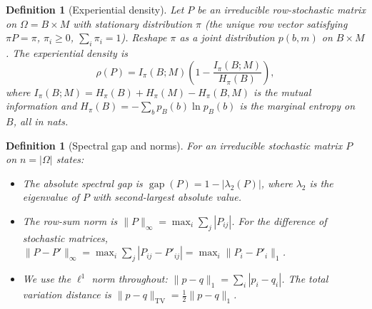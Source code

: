 \documentclass[11pt,a4paper]{article}
\newtheorem{definition}[theorem]{Definition}
\DeclareMathOperator{\gap}{gap}
\begin{document}
\begin{definition}[Experiential density]\label{def:rho}
Let $P$ be an irreducible row-stochastic matrix on $\Omega = B \times M$
with stationary distribution $\pi$ (the unique row vector satisfying
$\pi P = \pi$, $\pi_i \ge 0$, $\sum_i \pi_i = 1$).
Reshape $\pi$ as a joint distribution $p(b,m)$ on $B \times M$.
The \emph{experiential density} is
\begin{equation}\label{eq:rho-def}
  \rho(P) = I_\pi(B;M)\left(1 - \frac{I_\pi(B;M)}{H_\pi(B)}\right),
\end{equation}
where $I_\pi(B;M) = H_\pi(B) + H_\pi(M) - H_\pi(B,M)$ is the mutual
information and $H_\pi(B) = -\sum_b p_B(b)\ln p_B(b)$ is the marginal
entropy on $B$, all in nats.
\end{definition}

\begin{definition}[Spectral gap and norms]\label{def:gap}
For an irreducible stochastic matrix $P$ on $n = |\Omega|$ states:
\begin{itemize}
  \item The \emph{absolute spectral gap} is
        $\gap(P) = 1 - |\lambda_2(P)|$, where $\lambda_2$ is the
        eigenvalue of $P$ with second-largest absolute value.
  \item The \emph{row-sum norm} is
        $\|P\|_\infty = \max_i \sum_j |P_{ij}|$.
        For the difference of stochastic matrices,
        $\|P - P'\|_\infty = \max_i \sum_j |P_{ij} - P'_{ij}|
        = \max_i \|P_i - P'_i\|_1$.
  \item We use the $\ell^1$ norm throughout:
        $\|p - q\|_1 = \sum_i |p_i - q_i|$.
        The total variation distance is
        $\|p-q\|_{\mathrm{TV}} = \tfrac{1}{2}\|p-q\|_1$.
\end{itemize}
\end{definition}
\end{document}
